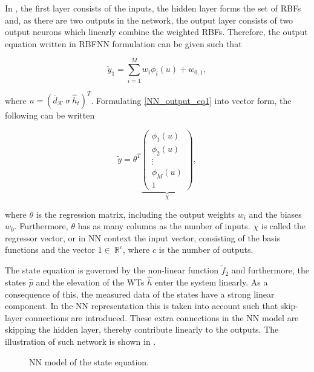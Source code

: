  \vspace{-3mm}

 In , the first layer consists of the inputs, the hidden layer forms the set of RBFs and, as there are two outputs in the network, the output layer consists of two output neurons which linearly combine the weighted RBFs. Therefore, the output equation written in RBFNN formulation can be given such that 

  \begin{equation}
\label{NN_output_eq1}
\tilde{y}_1 = \sum_{i = 1}^M w_i \phi_i(u) +  w_{0,1},
\end{equation}

where $u = (\bar{d}_{\mathcal{K}} \ \sigma \ \hat{h}_t )^T$. Formulating \eqref{NN_output_eq1} into vector form, the following can be written

  \begin{equation}
\label{NN_output_vector1}
\tilde{y} = \theta^T 
\underbrace{\begin{pmatrix}
           \phi_1(u) \\[1pt]
           \phi_2(u) \\[1pt]
           \vdots \\[1pt]
           \phi_M(u)\\[3pt]
           1 
         \end{pmatrix}}_{\chi},
\end{equation}

where $\theta$ is the regression matrix, including the output weights $w_i$ and the biases $w_0$. Furthermore, $\theta$ has as many columns as the number of inputs. $\chi$ is called the regressor vector, or in NN context the input vector, consisting of the basis functions and the vector $1 \in \: \mathbb{R}^{c} $, where $c$ is the number of outputs. 

The state equation is governed by the non-linear function $\tilde{f}_2$ and furthermore, the states $\hat{p}$ and the elevation of the WTs $\hat{h}$ enter the system linearly. As a consequence of this, the measured data of the states have a strong linear component. In the NN representation this is taken into account such that skip-layer connections are introduced. These extra connections in the NN model are skipping the hidden layer, thereby contribute linearly to the outputs. The illustration of such network is shown in .

 \begin{figure}[H]
 \centering
  
 \caption{NN model of the state equation.}
 \label{fig:nn_state}
 \end{figure}

